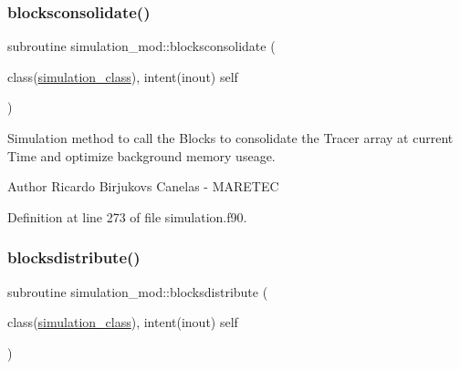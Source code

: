 \subsubsection{\texorpdfstring{blocksconsolidate()}{blocksconsolidate()}}
{\footnotesize\ttfamily subroutine simulation\+\_\+mod\+::blocksconsolidate (\begin{DoxyParamCaption}\item[{class(\mbox{\hyperlink{structsimulation__mod_1_1simulation__class}{simulation\+\_\+class}}), intent(inout)}]{self }\end{DoxyParamCaption})\hspace{0.3cm}{\ttfamily [private]}}



Simulation method to call the Blocks to consolidate the Tracer array at current Time and optimize background memory useage. 

\begin{DoxyAuthor}{Author}
Ricardo Birjukovs Canelas -\/ M\+A\+R\+E\+T\+EC 
\end{DoxyAuthor}


Definition at line 273 of file simulation.\+f90.


\mbox{\label{namespacesimulation__mod_a058892630af07fc0fe8a4bffec531c6a}} 
\subsubsection{\texorpdfstring{blocksdistribute()}{blocksdistribute()}}
{\footnotesize\ttfamily subroutine simulation\+\_\+mod\+::blocksdistribute (\begin{DoxyParamCaption}\item[{class(\mbox{\hyperlink{structsimulation__mod_1_1simulation__class}{simulation\+\_\+class}}), intent(inout)}]{self }\end{DoxyParamCaption})\hspace{0.3cm}{\ttfamily [private]}}



